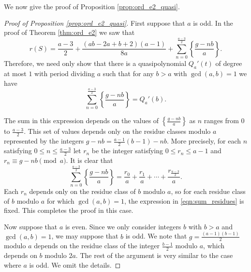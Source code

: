 \documentclass[12pt]{amsart}
\theoremstyle{plain}\newtheorem{proposition}{Proposition}[section]
\begin{document}
We now give the proof of Proposition \ref{prop:ord_e2_quasi}.
\begin{proof}[Proof of Proposition \ref{prop:ord_e2_quasi}]
First suppose that $a$ is odd.  In the proof of Theorem \ref{thm:ord_e2} we saw that 
\[
r(S) = \frac{a-3}{2} +  \frac{(ab - 2a + b + 2)(a - 1)}{8a} + 
\sum_{n=0}^{ \frac{a-3}{2}} \left\{\frac{g-nb}{a} \right\}.
\]
Therefore, we need only show that there is a quasipolynomial $Q_a'(t)$ of degree at most $1$ with period dividing $a$ such that for any $b>a$ with $\gcd(a,b) = 1$ we have
\[
\sum_{n=0}^{ \frac{a-3}{2}} \left\{\frac{g-nb}{a} \right\} = Q_a'(b).
\]

The sum in this expression depends on the values of $\left\{\frac{g-nb}{a} \right\}$ as $n$ ranges from $0$ to $\frac{a-3}{2}$.  This set of values depends only on the residue classes modulo $a$ represented by the integers $g-nb = \frac{a-1}{2} (b-1)- nb$.  More precisely, for each $n$ satisfying $0 \le n \le \frac{a-3}{2}$ let $r_n$ be the integer satisfying $0 \le r_n \le a-1$ and $r_n \equiv g-nb \pmod{a}$.  It is clear that 
\begin{equation}\label{eqn:sum_residues}
\sum_{n=0}^{ \frac{a-3}{2}} \left\{\frac{g-nb}{a} \right\} = \frac{r_0}{a} + \frac{r_1}{a} + \cdots + \frac{r_{\frac{a-3}{2}}}{a}.
\end{equation}
Each $r_n$ depends only on the residue class of $b$ modulo $a$, so for each residue class of $b$ modulo $a$ for which $\gcd(a,b) = 1$, the expression in \eqref{eqn:sum_residues} is fixed.  This completes the proof in this case.

Now suppose that $a$ is even.  Since we only consider integers $b$ with $b > a$ and $\gcd(a,b) = 1$, we may suppose that $b$ is odd.  We note that $g = \frac{(a-1)(b-1)}{2}$ modulo $a$ depends on the residue class of the integer $\frac{b-1}{2}$ modulo $a$, which depends on $b$ modulo $2a$.  The rest of the argument is very similar to the case where $a$ is odd.  We omit the details.
\end{proof}
\end{document}
